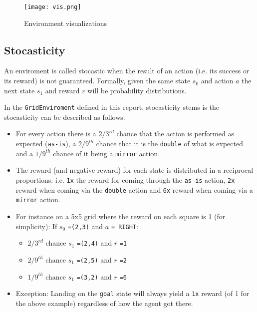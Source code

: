 \documentclass{article} %
\begin{document}
\begin{figure}[h]
    \begin{center}
        \texttt{[image: vis.png]}
    \end{center}
    \caption{Environment visualizations}
\end{figure}



\subsection{Stocasticity}
An enviroment is called stocastic when the result of an action (i.e. its success or its 
reward) is not guaranteed. Formally, given the same state $s_0$ and action $a$ the next state
$s_1$ and reward $r$ will be probability distributions.

In the \verb|GridEnviroment| defined in this report, stocasticity stems is the stocasticity
can be described as follows:
\begin{itemize}
    \item For every action there is a $2/3^{rd}$ chance that the action is performed as
        expected (\verb|as-is|), a $2/9^{th}$ chance that it is the \verb|double| of what 
        is expected and a $1/9^{th}$ chance of it being a \verb|mirror| action.
    \item The reward (and negative reward) for each state is distributed in a reciprocal
        proportions. i.e. \verb|1x| the reward for coming through the \verb|as-is| action,
        \verb|2x| reward when coming via the \verb|double| action and \verb|6x| reward when
        coming via a \verb|mirror| action.
    \item For instance on a 5x5 grid where the reward on each square is 1 (for simplicity):
    \newline
    If $s_0$ \verb|=(2,3)| and $a$ \verb|= RIGHT|:
        \begin{itemize}
            \item $2/3^{rd}$ chance $s_1$ \verb|=(2,4)| and $r$ \verb|=1|
            \item $2/9^{th}$ chance $s_1$ \verb|=(2,5)| and $r$ \verb|=2|
            \item $1/9^{th}$ chance $s_1$ \verb|=(3,2)| and $r$ \verb|=6|
        \end{itemize}
    \item Exception: Landing on the \verb|goal| state will always yield a \verb|1x| reward
        (of 1 for the above example) regardless of how the agent got there.
\end{itemize}
\end{document}
